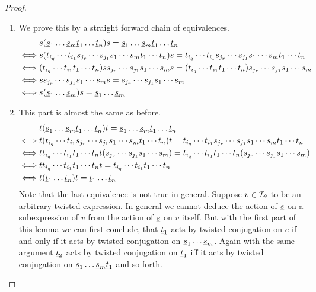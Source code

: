 \begin{lemm}
\begin{proof}
		\begin{enumerate}
			\item We prove this by a straight forward chain of equivalences.
			\begin{align*}
						& s (\underline{s}_1 \ldots \underline{s}_m \underline{t}_1 \ldots \underline{t}_n) s  =  \underline{s}_1 \ldots \underline{s}_m \underline{t}_1 \ldots \underline{t}_n \\
				\iff	& s (t_{i_q} \cdots t_{i_1} s_{j_r} \cdots s_{j_1} s_1 \cdots s_m t_1 \cdots t_n) s  =  t_{i_q} \cdots t_{i_1} s_{j_r} \cdots s_{j_1} s_1 \cdots s_m t_1 \cdots t_n \\
				\iff	& (t_{i_q} \cdots t_{i_1} t_1 \cdots t_n) s s_{j_r} \cdots s_{j_1} s_1 \cdots s_m s  =  (t_{i_q} \cdots t_{i_1} t_1 \cdots t_n) s_{j_r} \cdots s_{j_1} s_1 \cdots s_m \\
				\iff	& s s_{j_r} \cdots s_{j_1} s_1 \cdots s_m s  =  s_{j_r} \cdots s_{j_1} s_1 \cdots s_m \\
				\iff	& s (\underline{s}_1 \ldots \underline{s}_m) s = \underline{s}_1 \ldots \underline{s}_m
			\end{align*}
			\item This part is almost the same as before.
			\begin{align*}
						& t (\underline{s}_1 \ldots \underline{s}_m \underline{t}_1 \ldots \underline{t}_n) t  =  \underline{s}_1 \ldots \underline{s}_m \underline{t}_1 \ldots \underline{t}_n \\
				\iff	& t (t_{i_q} \cdots t_{i_1} s_{j_r} \cdots s_{j_1} s_1 \cdots s_m t_1 \cdots t_n) t  =  t_{i_q} \cdots t_{i_1} s_{j_r} \cdots s_{j_1} s_1 \cdots s_m t_1 \cdots t_n \\
				\iff	& t t_{i_q} \cdots t_{i_1} t_1 \cdots t_n t (s_{j_r} \cdots s_{j_1} s_1 \cdots s_m)  =  t_{i_q} \cdots t_{i_1} t_1 \cdots t_n (s_{j_r} \cdots s_{j_1} s_1 \cdots s_m) \\
				\iff	& t t_{i_q} \cdots t_{i_1} t_1 \cdots t_n t  =  t_{i_q} \cdots t_{i_1} t_1 \cdots t_n \\
				\iff	& t (\underline{t}_1 \ldots \underline{t}_n) t = \underline{t}_1 \ldots \underline{t}_n
			\end{align*}
			Note that the last equivalence is not true in general. Suppose $v \in \mathcal{I}_{\theta}$ to be an arbitrary twisted expression. In general we cannot deduce the action of $\underline{s}$ on a subexpression of $v$ from the action of $\underline{s}$ on $v$ itself. But with the first part of this lemma we can first conclude, that $\underline{t}_1$ acts by twisted conjugation on $e$ if and only if it acts by twisted conjugation on $\underline{s}_1 \ldots \underline{s}_m$. Again with the same argument $\underline{t}_2$ acts by twisted conjugation on $\underline{t}_1$ iff it acts by twisted conjugation on $\underline{s}_1 \ldots \underline{s}_m \underline{t}_1$ and so forth.

\end{enumerate}
\end{proof}
\end{lemm}
